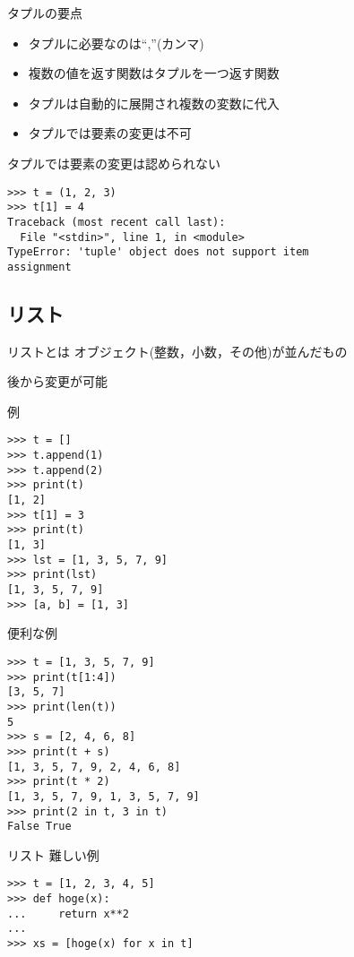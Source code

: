 \documentclass[12pt, xetex, xcolor=pdftex, dvipsnames]{beamer}
\begin{document}
\begin{frame}{タプルの要点}
    \begin{itemize}
        \item タプルに必要なのは``,''(カンマ)
        \item 複数の値を返す関数はタプルを一つ返す関数
        \item タプルは自動的に展開され複数の変数に代入
        \item \alert{タプルでは要素の変更は不可}
    \end{itemize}
\end{frame}
\begin{frame}[fragile]
    \alert{タプルでは要素の変更は認められない}
\begin{lstlisting}
>>> t = (1, 2, 3)
>>> t[1] = 4
Traceback (most recent call last):
  File "<stdin>", line 1, in <module>
TypeError: 'tuple' object does not support item
assignment
\end{lstlisting}
\end{frame}

\subsection{リスト}
\begin{frame}{リストとは}
    オブジェクト(整数，小数，その他)が並んだもの

    後から変更が可能
\end{frame}
\begin{frame}[fragile]{例}
    \begin{lstlisting}
>>> t = []
>>> t.append(1)
>>> t.append(2)
>>> print(t)
[1, 2]
>>> t[1] = 3
>>> print(t)
[1, 3]
>>> lst = [1, 3, 5, 7, 9]
>>> print(lst)
[1, 3, 5, 7, 9]
>>> [a, b] = [1, 3]
    \end{lstlisting}
\end{frame}
\begin{frame}[fragile]{便利な例}
    \begin{lstlisting}
>>> t = [1, 3, 5, 7, 9]
>>> print(t[1:4])
[3, 5, 7]
>>> print(len(t))
5
>>> s = [2, 4, 6, 8]
>>> print(t + s)
[1, 3, 5, 7, 9, 2, 4, 6, 8]
>>> print(t * 2)
[1, 3, 5, 7, 9, 1, 3, 5, 7, 9]
>>> print(2 in t, 3 in t)
False True
    \end{lstlisting}
\end{frame}
\begin{frame}[fragile]{リスト}
    難しい例
\begin{lstlisting}
>>> t = [1, 2, 3, 4, 5]
>>> def hoge(x):
...     return x**2
... 
>>> xs = [hoge(x) for x in t]
\end{lstlisting}
\end{frame}
\end{document}
